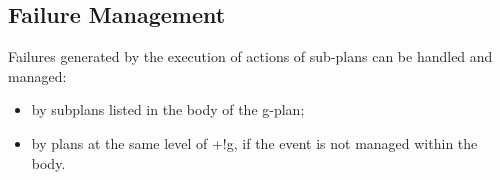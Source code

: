 %
%
%
%
%
%
%
%
% 
% 

 \subsection{Failure Management}

Failures generated by the execution of actions of sub-plans can be handled and managed:

\begin{itemize}
\item by subplans listed in the body of the g-plan;
\item by plans at the same level of +!g, if the event is not managed
  within the body.
\end{itemize}

